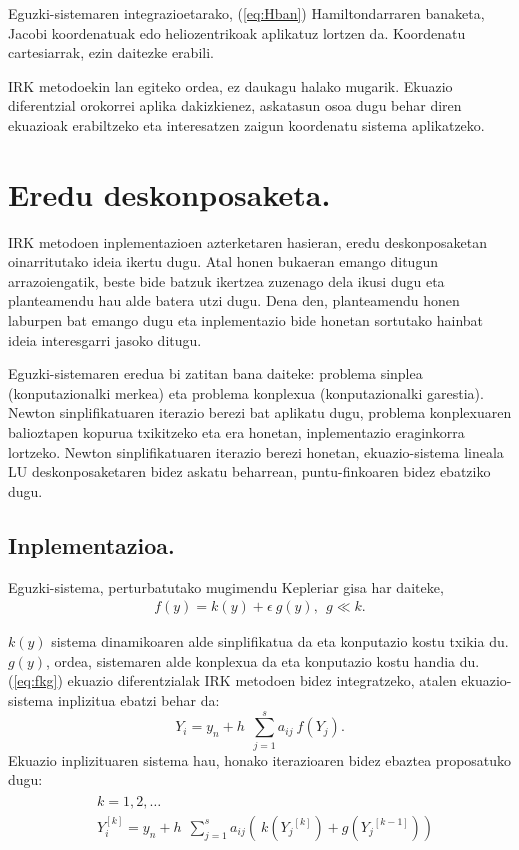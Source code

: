 Eguzki-sistemaren integrazioetarako, (\ref{eq:Hban}) Hamiltondarraren banaketa, Jacobi koordenatuak edo heliozentrikoak aplikatuz lortzen da.
Koordenatu cartesiarrak, ezin daitezke erabili.

IRK metodoekin lan egiteko ordea, ez daukagu halako mugarik. Ekuazio diferentzial orokorrei aplika dakizkienez, askatasun osoa dugu behar diren ekuazioak erabiltzeko eta interesatzen zaigun koordenatu sistema aplikatzeko.  


\section{Eredu deskonposaketa.}


IRK metodoen inplementazioen azterketaren hasieran, eredu deskonposaketan oinarritutako ideia ikertu dugu. Atal honen bukaeran emango ditugun arrazoiengatik, beste bide batzuk ikertzea zuzenago dela ikusi dugu eta planteamendu hau alde batera utzi dugu. Dena den, planteamendu honen laburpen bat emango dugu eta inplementazio bide honetan sortutako hainbat ideia interesgarri jasoko ditugu.

Eguzki-sistemaren eredua bi zatitan bana daiteke: problema sinplea (konputazionalki merkea) eta problema konplexua (konputazionalki garestia). Newton sinplifikatuaren iterazio berezi bat aplikatu dugu, problema konplexuaren balioztapen kopurua txikitzeko eta era honetan, inplementazio eraginkorra lortzeko. Newton sinplifikatuaren iterazio berezi honetan, ekuazio-sistema lineala LU deskonposaketaren bidez askatu beharrean, puntu-finkoaren bidez ebatziko dugu.


\subsection*{Inplementazioa.}
Eguzki-sistema, perturbatutako mugimendu Kepleriar gisa har daiteke,  
\begin{align}
\label{eq:fkg}
 f(y)=  k(y) + \epsilon \ g (y), \ \ g\ll k.   
\end{align}
 
$k(y)$ sistema dinamikoaren alde sinplifikatua da eta konputazio kostu txikia du. $g(y)$, ordea, sistemaren alde konplexua da eta konputazio kostu handia du. (\ref{eq:fkg}) ekuazio diferentzialak IRK metodoen bidez integratzeko, atalen ekuazio-sistema inplizitua ebatzi behar da: 
\begin{equation*}
Y_i=y_n+h\ \ \sum^s_{j=1}{a_{ij} \ f({Y_j}) }. 
\end{equation*} 
%
Ekuazio inplizituaren sistema hau, honako iterazioaren bidez ebaztea proposatuko dugu:
\begin{align}
\begin{split}
&k=1,2,\dots \\
&Y_i^{[k]}=y_n+h\ \ \sum^s_{j=1}{a_{ij}(\ k({Y_j}^{[k]})+g({Y_j}^{[k-1]})) }
\end{split}
\end{align}

